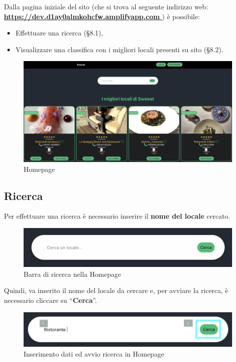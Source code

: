 Dalla pagina iniziale del sito (che si trova al seguente indirizzo web: \href{https://dev.d1ay0almkohcfw.amplifyapp.com}{\textbf{https://dev.d1ay0almkohcfw.amplifyapp.com} }) è possibile:

\begin{itemize}
\item Effettuare una ricerca (\S{8.1}),
\item Visualizzare una classifica con i migliori locali presenti su sito (\S{8.2}).  
\end{itemize}

\begin{figure}[H]
\centering
\includegraphics[scale=0.3]{./images/Homepage/Homepage.png} 
\caption{Homepage}
\end{figure}

\subsection{Ricerca}

Per effettuare una ricerca è necessario inserire il \textbf{nome del locale} cercato.

\begin{figure}[H]
\centering
\includegraphics[scale=0.45]{./images/Homepage/Ricerca.png} 
\caption{Barra di ricerca nella Homepage}
\end{figure}

Quindi, va inserito il nome del locale da cercare e, per avviare la ricerca, è necessario cliccare su “\textbf{Cerca}”.

\begin{figure}[H]
\centering
\includegraphics[scale=0.5]{./images/Homepage/Ricerca2.png} 
\caption{Inserimento dati ed avvio ricerca in Homepage}
\end{figure}

